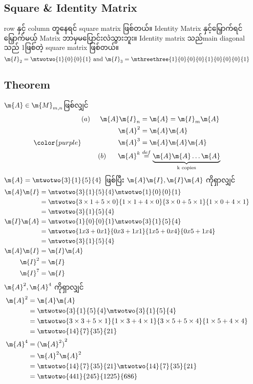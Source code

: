 \subsection{Square \& Identity Matrix}
row နှင့် column တူနေရင် square matrix ဖြစ်တယ်။ Identity Matrix နှင့်မြှောက်ရင် မြှောက်မယ့် Matrix ဘာမှမပြောင်းလဲသွားဘူး။ Identity matrix သည်main diagonal သည် 1ဖြစ်တဲ့ square matrix ဖြစ်တယ်။
\[
    \m{I}_2=\mtwotwo{1}{0}{0}{1} \text{ and } \m{I}_3=\mthreethree{1}{0}{0}{0}{1}{0}{0}{0}{1}
\]
\subsection{Theorem}
$\m{A}\in\m{M}_{m,n}$ဖြစ်လျှင်
\begin{equation}
    {\color{purple}\begin{split}
         (a)\hspace{5mm}\m{A}\m{I}_n&=\m{A}=\m{I}_m\m{A} \\
         \m{A}^2&=\m{A}\m{A} \\
         \m{A}^3&=\m{A}\m{A}\m{A} \\
         (b)\hspace{6mm}\m{A}^k&\stackrel{def}{=}\underbrace{\m{A}\m{A}\dots\m{A}}_{\text{k copies}}
    \end{split}}
\end{equation}
$\m{A}=\mtwotwo{3}{1}{5}{4}$ ဖြစ်ပြီး $\m{A}\m{I},\m{I}\m{A}$ ကိုရှာလျှင်
\[
    \begin{split}
        \m{A}\m{I}&=\mtwotwo{3}{1}{5}{4}\mtwotwo{1}{0}{0}{1} \\
        &=\mtwotwo{3 \times 1+5 \times 0}{1 \times 1+4 \times 0}{3 \times 0+5 \times 1}{1 \times 0+4 \times 1} \\
        &=\mtwotwo{3}{1}{5}{4} \\
        \m{I}\m{A}&=\mtwotwo{1}{0}{0}{1}\mtwotwo{3}{1}{5}{4} \\
        &=\mtwotwo{1x3+0x1}{0x3+1x1}{1x5+0x4}{0x5+1x4} \\
        &=\mtwotwo{3}{1}{5}{4} \\
        \m{A}\m{I}&=\m{I}\m{A} \\
        \m{I}^2&=\m{I} \\
        \m{I}^7&=\m{I}
    \end{split}
\]
$\m{A}^2,\m{A}^4$ ကိုရှာလျှင်
\[
    \begin{split}
        \m{A}^2&=\m{A}\m{A} \\
        &=\mtwotwo{3}{1}{5}{4}\mtwotwo{3}{1}{5}{4} \\
        &=\mtwotwo{3 \times 3+5 \times 1}{1 \times 3+4 \times 1}{3 \times 5+5 \times 4}{1 \times 5+4 \times 4} \\
        &=\mtwotwo{14}{7}{35}{21} \\
        \m{A}^4&={(\m{A}^2)}^2 \\
        &=\m{A}^2\m{A}^2 \\
        &=\mtwotwo{14}{7}{35}{21}\mtwotwo{14}{7}{35}{21} \\
        &=\mtwotwo{441}{245}{1225}{686} \\
    \end{split}
\]
